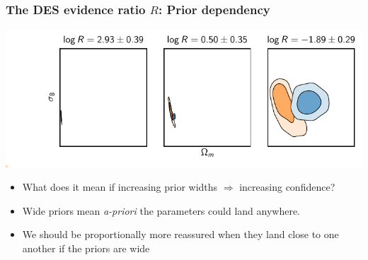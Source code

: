 \documentclass[aspectratio=169]{beamer}
\begin{document}
\begin{frame}
    \frametitle{The DES evidence ratio $R$: Prior dependency}
    \centerline{\includegraphics[trim=0.6in 0.3in 0in 0in]{./plots/prior_dependency.pdf}}
    \vspace{10pt}
    \begin{itemize}
        \item What does it mean if increasing prior widths $\Rightarrow$ increasing confidence? 
        \item Wide priors mean {\em a-priori\/} the parameters could land anywhere.
        \item We should be proportionally more reassured when they land close to one another if the priors are wide
    \end{itemize}
\end{frame}
\end{document}
